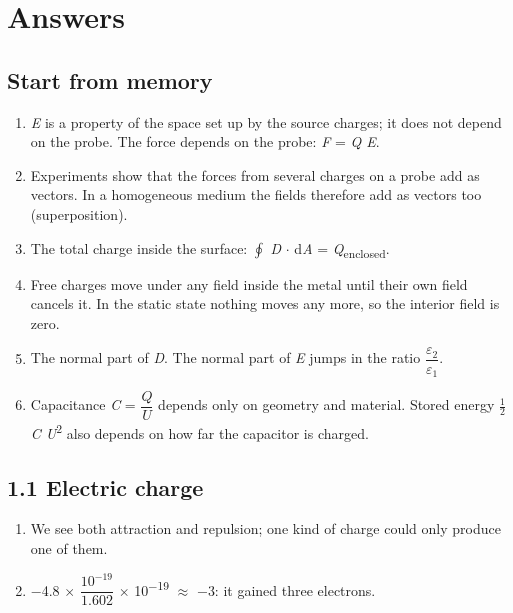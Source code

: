 \documentclass[11pt]{article}
\begin{document}
\clearpage
\section{Answers}
\begin{keepsection}\subsection{Start from memory}

\begin{enumerate}
\item \textit{E} is a property of the space set up by the source charges; it does not depend on the probe. The force depends on the probe: \textit{F} = \textit{Q E}.
\item Experiments show that the forces from several charges on a probe add as vectors. In a homogeneous medium the fields therefore add as vectors too (superposition).
\item The total charge inside the surface: $\oint $ \textit{D} \ensuremath{\cdot} d\textit{A} = \textit{Q}\textsubscript{enclosed}.
\item Free charges move under any field inside the metal until their own field cancels it. In the static state nothing moves any more, so the interior field is zero.
\item The normal part of \textit{D}. The normal part of \textit{E} jumps in the ratio {\small\ensuremath{\dfrac{ε_{2}}{ε_{1}}}}.
\item Capacitance \textit{C} = {\small\ensuremath{\dfrac{{Q}}{{U}}}} depends only on geometry and material. Stored energy \ensuremath{\tfrac12}\textit{C U}\textsuperscript{2} also depends on how far the capacitor is charged.
\end{enumerate}

\end{keepsection}
\begin{keepsection}\subsection{1.1 Electric charge}

\begin{enumerate}
\item We see both attraction and repulsion; one kind of charge could only produce one of them.
\item \ensuremath{-}4.8 \ensuremath{\times} {\small\ensuremath{\dfrac{10^{-19}}{1.602}}} \ensuremath{\times} 10\textsuperscript{\ensuremath{-}19} \ensuremath{\approx} \ensuremath{-}3: it gained three electrons.
\end{enumerate}

\end{keepsection}
\end{document}
